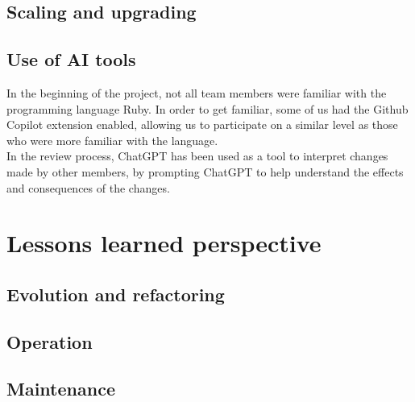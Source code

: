 \documentclass{article}
\begin{document}
\subsection{Scaling and upgrading}

\subsection{Use of AI tools}

In the beginning of the project, not all team members were familiar with the programming language Ruby. In order to get familiar, some of us had the Github Copilot extension enabled, allowing us to participate on a similar level as those who were more familiar with the language.\\

In the review process, ChatGPT has been used as a tool to interpret changes made by other members, by prompting ChatGPT to help understand the effects and consequences of the changes.\\

\section{Lessons learned perspective}

\subsection{Evolution and refactoring}

\subsection{Operation}

\subsection{Maintenance}
\end{document}
